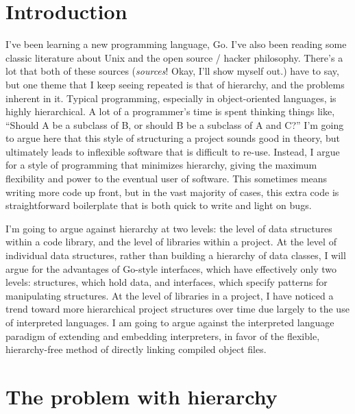 \documentclass[12pt]{article}
\begin{document}
\maketitle


\section{Introduction}

I've been learning a new programming language, Go. I've also been reading some
classic literature about Unix and the open source / hacker philosophy. There's
a lot that both of these sources (\textit{sources}! Okay, I'll show myself
out.) have to say, but one theme that I keep seeing repeated is that of
hierarchy, and the problems inherent in it. Typical programming, especially in
object-oriented languages, is highly hierarchical. A lot of a programmer's time
is spent thinking things like, ``Should A be a subclass of B, or should B be a
subclass of A and C?'' I'm going to argue here that this style of structuring a
project sounds good in theory, but ultimately leads to inflexible software that
is difficult to re-use. Instead, I argue for a style of programming that
minimizes hierarchy, giving the maximum flexibility and power to the eventual
user of software. This sometimes means writing more code up front, but in the
vast majority of cases, this extra code is straightforward boilerplate that is
both quick to write and light on bugs.

I'm going to argue against hierarchy at two levels: the level of data
structures within a code library, and the level of libraries within a project.
At the level of individual data structures, rather than building a hierarchy of
data classes, I will argue for the advantages of Go-style interfaces, which
have effectively only two levels: structures, which hold data, and interfaces,
which specify patterns for manipulating structures.  At the level of libraries
in a project, I have noticed a trend toward more hierarchical project
structures over time due largely to the use of interpreted languages.  I am
going to argue against the interpreted language paradigm of extending and
embedding interpreters, in favor of the flexible, hierarchy-free method of
directly linking compiled object files.

\section{The problem with hierarchy}
\end{document}
